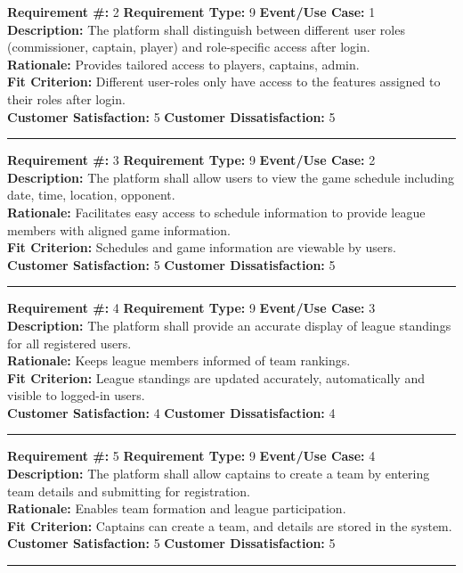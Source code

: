\documentclass[12pt]{article}
\begin{document}
\textbf{Requirement \#:} 2 \quad \textbf{Requirement Type:} 9 \quad \textbf{Event/Use Case:} 1 \\
\textbf{Description:} The platform shall distinguish between different user roles (commissioner, captain, player) and role-specific access after login.\\
\textbf{Rationale:}  Provides tailored access to players, captains, admin.\\
\textbf{Fit Criterion:} Different user-roles only have access to the features assigned to their roles after login.\\
\textbf{Customer Satisfaction:} 5 \quad\quad \textbf{Customer Dissatisfaction:} 5 \\
\noindent\rule{\textwidth}{1pt}

\textbf{Requirement \#:} 3 \quad \textbf{Requirement Type:} 9 \quad \textbf{Event/Use Case:} 2 \\
\textbf{Description:} The platform shall allow users to view the game schedule including date, time, location, opponent.\\
\textbf{Rationale:} Facilitates easy access to schedule information to provide league members with aligned game information.\\
\textbf{Fit Criterion:} Schedules and game information are viewable by users.\\
\textbf{Customer Satisfaction:} 5 \quad\quad \textbf{Customer Dissatisfaction:} 5\\
\noindent\rule{\textwidth}{1pt}

\textbf{Requirement \#:} 4 \quad \textbf{Requirement Type:} 9 \quad \textbf{Event/Use Case:} 3 \\
\textbf{Description:} The platform shall provide an accurate display of league standings for all registered users.\\
\textbf{Rationale:} Keeps league members informed of team rankings.\\
\textbf{Fit Criterion:} League standings are updated accurately, automatically and visible to logged-in users.\\
\textbf{Customer Satisfaction:} 4 \quad\quad \textbf{Customer Dissatisfaction:} 4\\
\noindent\rule{\textwidth}{1pt}

\textbf{Requirement \#:} 5 \quad \textbf{Requirement Type:} 9 \quad \textbf{Event/Use Case:} 4 \\
\textbf{Description:} The platform shall allow captains to create a team by entering team details and submitting for registration.\\
\textbf{Rationale:} Enables team formation and league participation.\\
\textbf{Fit Criterion:} Captains can create a team, and details are stored in the system.\\
\textbf{Customer Satisfaction:} 5 \quad\quad \textbf{Customer Dissatisfaction:} 5\\
\noindent\rule{\textwidth}{1pt}
\end{document}
